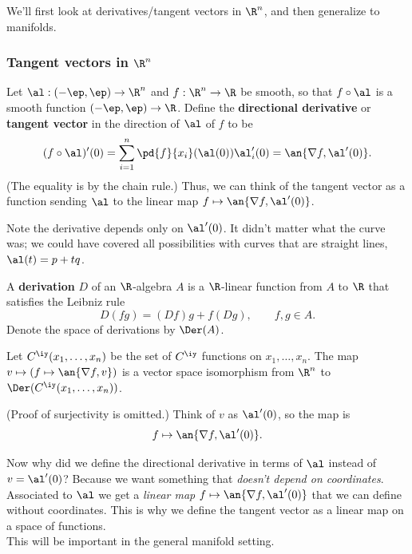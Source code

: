 We'll first look at derivatives/tangent vectors in $\R^n$, and then generalize to manifolds.
\subsubsection{Tangent vectors in $\R^n$}
\begin{df}
Let $\al:(-\ep,\ep)\to \R^n$ and $f:\R^n\to \R$ be smooth, so that $f\circ \al$ is a smooth function $(-\ep,\ep)\to \R$.
Define the \textbf{directional derivative} or \textbf{tangent vector} in the direction of $\al$ of $f$ to be 
\[
(f\circ \al)'(0)=\sum_{i=1}^n \pd{f}{x_i} (\al(0))\al_i'(0)=\an{\nabla f,\al'(0)}.
\]
(The equality is by the chain rule.)
Thus, we can think of the tangent vector as a function sending $\al$ to the linear map $f\mapsto \an{\nabla f,\al'(0)}$.
\end{df}
Note the derivative depends only on $\al'(0)$. It didn't matter what the curve was; we could have covered all possibilities with curves that are straight lines, $\al(t)=p+tq$.

\begin{df}
A \textbf{derivation} $D$ of an $\R$-algebra $A$ is a $\R$-linear function from $A$ to $\R$ that satisfies the Leibniz rule \[D(fg)=(Df)g+f(Dg),\qquad f,g\in A.\]
Denote the space of derivations by $\Der(A)$.
\end{df}
\begin{pr}
Let $C^{\iy}(x_1,\ldots, x_n)$ be the set of $C^{\iy}$ functions on $x_1,\ldots, x_n$.
The map $v\mapsto (f\mapsto \an{\nabla f,v})$ is a vector space isomorphism from $\R^n$ to $\Der(C^{\iy}(x_1,\ldots, x_n))$.
\end{pr}
(Proof of surjectivity is omitted.) Think of $v$ as $\al'(0)$, so the map is
\[
f\mapsto \an{\nabla f,\al'(0)}.
\]

Now why did we define the directional derivative in terms of $\al$ instead of $v=\al'(0)$? Because we want something that {\it doesn't depend on coordinates}. Associated to $\al$ we get a {\it linear map} $f\mapsto \an{\nabla f,\al'(0)}$ that we can define without coordinates. This is why we define the tangent vector as a linear map on a space of functions.\\

\vskip0.15in
This will be important in the general manifold setting.

